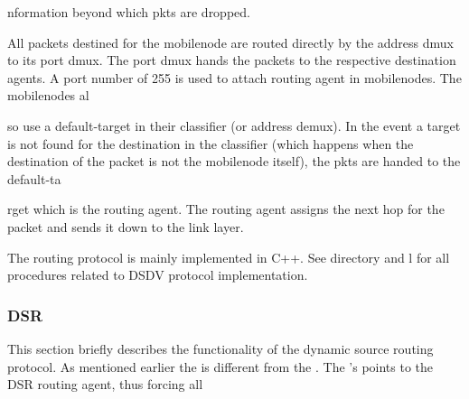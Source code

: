 nformation beyond which pkts are dropped.

All packets destined for the mobilenode are routed directly by the address dmux to its port dmux. The port dmux hands the packets to the respective destination agents. A port number of 255 is used to attach routing agent in mobilenodes. The mobilenodes al





















so use a default-target in their classifier (or address demux). In the event a target is not found for the destination in the classifier (which happens when the destination of the packet is not the mobilenode itself), the pkts are handed to the default-ta





















rget which is the routing agent. The routing agent assigns the next hop for the packet and sends it down to the link layer.

The routing protocol is mainly implemented in C++. See  directory and l for all procedures related to DSDV protocol implementation.


\subsubsection{DSR}
\label{sec:dsr}

This section briefly describes the functionality of the dynamic source routing protocol. As mentioned earlier the  is different from the .  The 's  points to the DSR routing agent, thus forcing all 





















